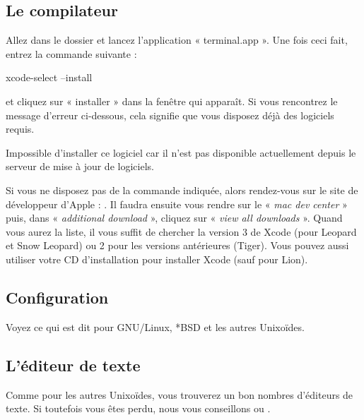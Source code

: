 \subsection{Le compilateur}

Allez dans le dossier  et lancez
l'application « terminal.app ». Une fois ceci fait, entrez la commande
suivante :

\begin{bash}
xcode-select --install
\end{bash}

et cliquez sur « installer » dans la fenêtre qui apparaît. Si vous
rencontrez le message d'erreur ci-dessous, cela signifie que vous
disposez déjà des logiciels requis.

\begin{bash}
  Impossible d’installer ce logiciel car il n’est pas disponible
  actuellement depuis le serveur de mise à jour de logiciels.
\end{bash}

Si vous ne disposez pas de la commande indiquée, alors rendez-vous sur
le site de développeur d'Apple :
.  Il faudra ensuite vous rendre sur le « \emph{mac
  dev center} » puis, dans « \emph{additional download} », cliquez sur
« \emph{view all downloads} ». Quand vous aurez la liste, il vous
suffit de chercher la version 3 de Xcode (pour Leopard et Snow
Leopard) ou 2 pour les versions antérieures (Tiger). Vous pouvez aussi
utiliser votre CD d'installation pour installer Xcode (sauf pour
Lion).

\subsection{Configuration}\label{configuration}

Voyez ce qui est dit pour GNU/Linux, *BSD et les autres Unixoïdes.

\subsection{L'éditeur de texte}\label{luxe9diteur-de-texte}

Comme pour les autres Unixoïdes, vous trouverez un bon nombres
d'éditeurs de texte. Si toutefois vous êtes perdu, nous vous
conseillons
ou .

